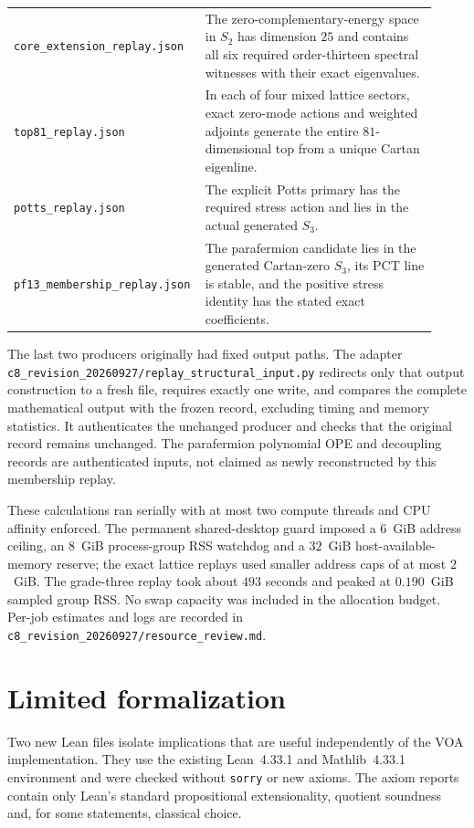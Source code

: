 \documentclass[11pt,a4paper]{article}
\theoremstyle{definition}
\newcommand{\artifact}[1]{\textnormal{\nolinkurl{#1}}}
\begin{document}
\begin{longtable}{@{}p{0.38\linewidth}p{0.54\linewidth}@{}}
\artifact{core_extension_replay.json} & The zero-complementary-energy
space in $S_2$ has dimension $25$ and contains all six required
order-thirteen spectral witnesses with their exact eigenvalues.\\
\artifact{top81_replay.json} & In each of four mixed lattice sectors,
exact zero-mode actions and weighted adjoints generate the entire
$81$-dimensional top from a unique Cartan eigenline.\\
\artifact{potts_replay.json} & The explicit Potts primary has the
required stress action and lies in the actual generated $S_3$.\\
\artifact{pf13_membership_replay.json} & The parafermion candidate
lies in the generated Cartan-zero $S_3$, its PCT line is stable,
and the positive stress identity has the stated exact coefficients.\\
\end{longtable}

The last two producers originally had fixed output paths. The adapter
\artifact{c8_revision_20260927/replay_structural_input.py} redirects
only that output construction to a fresh file, requires exactly one
write, and compares the complete mathematical output with the frozen
record, excluding timing and memory statistics. It authenticates the
unchanged producer and checks that the original record remains unchanged.
The parafermion polynomial OPE and decoupling records are authenticated
inputs, not claimed as newly reconstructed by this membership replay.

These calculations ran serially with at most two compute threads and
CPU affinity enforced. The permanent shared-desktop guard imposed
a $6$~GiB address ceiling, an $8$~GiB process-group RSS watchdog and
a $32$~GiB host-available-memory reserve; the exact lattice replays
used smaller address caps of at most $2$~GiB. The grade-three replay
took about $493$ seconds and peaked at $0.190$~GiB sampled group RSS.
No swap capacity was included in the allocation budget. Per-job
estimates and logs are recorded in
\artifact{c8_revision_20260927/resource_review.md}.

\section{Limited formalization}\label{sec:formalization}
Two new Lean files isolate implications that are useful independently
of the VOA implementation. They use the existing Lean~4.33.1 and
Mathlib~4.33.1 environment and were checked without \texttt{sorry} or
new axioms. The axiom reports contain only Lean's standard
propositional extensionality, quotient soundness and, for some
statements, classical choice.
\end{document}

